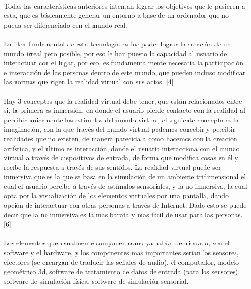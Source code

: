 \documentclass{bmcart}
\begin{document}
\paragraph{}
Todas las características anteriores intentan lograr los objetivos que le pusieron a esta, que es básicamente generar un entorno a base de un ordenador que no pueda ser diferenciado con el mundo real.
\paragraph{}
La idea fundamental de esta tecnología es  fue poder lograr la creación de un mundo irreal pero posible, por eso le han puesto la capacidad al usuario de interactuar con el lugar, por eso, es fundamentalmente necesaria la participación e interacción de las personas dentro de este mundo, que pueden incluso modificar las normas que rigen la realidad virtual con sus actos. [4]
\paragraph{}
Hay 3 conceptos que la realidad virtual debe tener, que están relacionados entre si, la primera es inmersión, en donde el usuario pierde contacto con la realidad al percibir únicamente los estímulos del mundo virtual, el siguiente concepto es la imaginación, con la que través del mundo virtual podemos concebir y percibir realidades que no existen, de manera parecida a como hacemos con la creación artística, y el ultimo es interacción, donde el usuario interacciona con el mundo virtual a través de dispositivos de entrada, de forma que modifica cosas en él y recibe la respuesta a través de sus sentidos. La realidad virtual puede ser inmersiva que es la que se basa en la simulación de un ambiente tridimensional el cual el usuario percibe a través de estímulos sensoriales, y la no inmersiva, la cual opta por la visualización de los elementos virtuales por una pantalla, dando opción de interactuar con otras personas a través de Internet. Dado esto se puede decir que la no inmersiva es la mas barata y mas fácil de usar para las personas. [6]
\paragraph{}
Los elementos que usualmente componen como ya había mencionado, son el software y el hardware, y los componentes mas importantes serian los sensores, efectores (se encargan de traducir las señales de audio), el computador, modelo geométrico 3d, software de tratamiento de datos de entrada (para los sensores), software de simulación física, software de simulación sensorial. 
\end{document}

